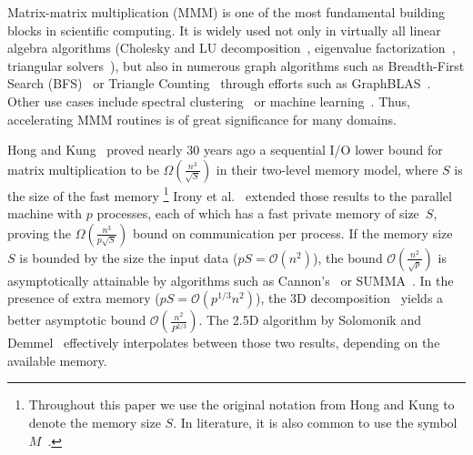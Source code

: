 \documentclass[sigplan,review,anonymous]{acmart}\settopmatter{printfolios=true,printccs=false,printacmref=false}
\newcommand\mac[1]{\textcolor{red}{[Mac: #1]}}
\begin{document}
Matrix-matrix multiplication (MMM) is one of the most fundamental building
blocks in scientific computing. It is widely used not only in virtually all
linear algebra algorithms (Cholesky and LU
decomposition~\cite{meyer2000matrix}, eigenvalue
factorization~\cite{chatelin2012eigenvalues}, triangular
solvers~\cite{linearAlgebraLAPACK}), but also in numerous graph algorithms such
as Breadth-First Search (BFS)~\cite{cormen2009introduction} or Triangle
Counting~\cite{azad2015parallel} through efforts such as
GraphBLAS~\cite{kepner2016mathematical}. Other use cases include spectral
clustering~\cite{ng2002spectral} or machine
learning~\cite{abadi2016tensorflow}.  Thus, accelerating MMM routines is of
great significance for many domains.

Hong and Kung~\cite{redblue} proved nearly 30 years ago a sequential I/O lower
bound for matrix multiplication to be $\Omega\left(\frac{n^3}{\sqrt{S}}\right)$
in their two-level memory model, where $S$
is the size of the fast memory
%
\footnote{Throughout this paper we use the original notation from Hong and Kung 
to denote the memory size $S$. In literature, it is also common to use the 
symbol $M$~\cite{externalMem,IronyMMM, parallelExMem}.} 
	Irony et al.~\cite{IronyMMM} extended those
results to the parallel machine with $p$ processes,
each of which has a fast private memory of size~$S$, proving the
$\Omega\left(\frac{n^3}{p\sqrt{S}}\right)$ bound on communication per process.
%
%
If the memory size~$S$ is bounded by the size the
input data ($pS = \mathcal{O}(n^2)$), the bound
$\mathcal{O}\left(\frac{n^2}{\sqrt{p}}\right)$  is asymptotically attainable by
algorithms such as Cannon's~\cite{Cannon} or SUMMA~\cite{summa}. In the
presence of extra memory ($pS = \mathcal{O}(p^{1/3} n^2)$), the 3D
decomposition~\cite{summa3d} yields a better asymptotic bound
$\mathcal{O}\left(\frac{n^2}{P^{2/3}}\right)$. The 2.5D algorithm by Solomonik
and Demmel~\cite{25d} effectively interpolates
between those two results, depending on the available
memory.
\end{document}
